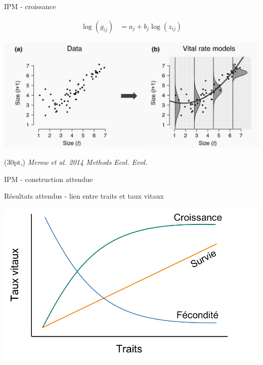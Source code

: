\documentclass[11pt, compress, aspectratio=1610]{beamer}
\newcommand\smallcitation[1]{%
\begin{textblock*}{\textwidth}(30pt,\textheight)
	\raggedleft \footnotesize\textit{#1}
\end{textblock*}}
\begin{document}
\begin{frame}{IPM - croissance}
\protect\hypertarget{ipm---croissance}{}

\vspace*{-13mm}
\begin{align*}
  \log(g_{ij}) &= a_{j} + b_{j}\log(z_{ij})
\end{align*}

\centering

\includegraphics[scale=0.46]{figures/Merow2014a.png}

\par

\smallcitation{Merow et al. 2014 Methods Ecol. Evol.}

\end{frame}

\begin{frame}{IPM - construction attendue}
\protect\hypertarget{ipm---construction-attendue}{}



\end{frame}

\begin{frame}{Résultats attendus - lien entre traits et taux vitaux}
\protect\hypertarget{ruxe9sultats-attendus---lien-entre-traits-et-taux-vitaux}{}

\centering

\includegraphics[scale=0.55]{figures/output_chap1.png}

\par

\end{frame}
\end{document}
